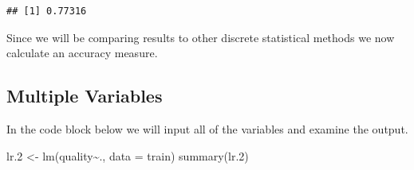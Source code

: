 \documentclass[
]{book}
\newenvironment{Shaded}{\begin{snugshade}}{\end{snugshade}}
\newcommand{\AttributeTok}[1]{\textcolor[rgb]{0.77,0.63,0.00}{#1}}
\newcommand{\FloatTok}[1]{\textcolor[rgb]{0.00,0.00,0.81}{#1}}
\newcommand{\FunctionTok}[1]{\textcolor[rgb]{0.00,0.00,0.00}{#1}}
\newcommand{\NormalTok}[1]{#1}
\newcommand{\OtherTok}[1]{\textcolor[rgb]{0.56,0.35,0.01}{#1}}
\newcommand{\SpecialCharTok}[1]{\textcolor[rgb]{0.00,0.00,0.00}{#1}}
\begin{document}
\begin{Shaded}
\end{Shaded}

\begin{verbatim}
## [1] 0.77316
\end{verbatim}

Since we will be comparing results to other discrete statistical methods we now calculate an accuracy measure.

\begin{Shaded}
\end{Shaded}

\hypertarget{multiple-variables}{%
\subsection{Multiple Variables}\label{multiple-variables}}

In the code block below we will input all of the variables and examine the output.

\begin{Shaded}
\begin{Highlighting}[]
\NormalTok{lr}\FloatTok{.2} \OtherTok{\textless{}{-}} \FunctionTok{lm}\NormalTok{(quality}\SpecialCharTok{\textasciitilde{}}\NormalTok{., }\AttributeTok{data =}\NormalTok{ train)}
\FunctionTok{summary}\NormalTok{(lr}\FloatTok{.2}\NormalTok{)}
\end{Highlighting}
\end{Shaded}
\end{document}
